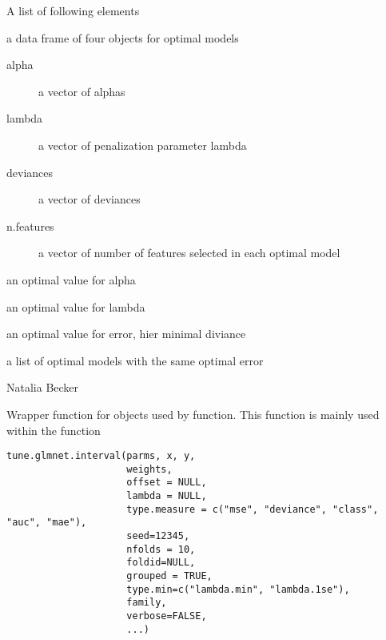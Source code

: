 \documentclass[letterpaper]{book}
\begin{document}
\begin{Value}
A list of following elements 
\begin{ldescription}
\item[\code{info}] 
a data frame of four objects for optimal models\\{}
\begin{description}
  
\item[alpha] a vector of alphas 
\item[lambda] a vector of  penalization parameter lambda
\item[deviances]     a vector of deviances  
\item[n.features] a vector of number of features selected in each optimal model 

\end{description}

 
\item[\code{opt.alpha}]  an optimal value for alpha
\item[\code{opt.lambda}] an optimal value for lambda
\item[\code{opt.error}]  an optimal value for error, hier minimal diviance
\item[\code{opt.models}]   a list of optimal models with the same optimal error 
\end{ldescription}
\end{Value}
%
\begin{Author}\relax
Natalia Becker  \bsl{}
\end{Author}
%
\begin{SeeAlso}\relax
\end{SeeAlso}
%
\begin{Description}\relax
Wrapper function for  objects used by  function.
This function is  mainly used within the function   
\end{Description}
%
\begin{Usage}
\begin{verbatim}
tune.glmnet.interval(parms, x, y,
                     weights, 
                     offset = NULL, 
                     lambda = NULL, 
                     type.measure = c("mse", "deviance", "class", "auc", "mae"),
                     seed=12345, 
                     nfolds = 10, 
                     foldid=NULL, 
                     grouped = TRUE, 
                     type.min=c("lambda.min", "lambda.1se"),
                     family,
                     verbose=FALSE,
                     ...)
\end{verbatim}
\end{Usage}
\end{document}
